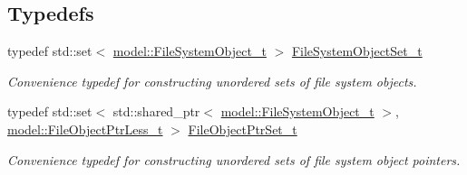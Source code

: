 \subsection*{Typedefs}
\begin{DoxyCompactItemize}
\item 
typedef std\+::set$<$ \hyperlink{structmodel_1_1_file_system_object__t}{model\+::\+File\+System\+Object\+\_\+t} $>$ \hyperlink{namespacemodel_aeb77dad74c69ec8bfc42dc205bac3f4b}{File\+System\+Object\+Set\+\_\+t}
\begin{DoxyCompactList}\small\item\em Convenience typedef for constructing unordered sets of file system objects. \end{DoxyCompactList}\item 
typedef std\+::set$<$ std\+::shared\+\_\+ptr$<$ \hyperlink{structmodel_1_1_file_system_object__t}{model\+::\+File\+System\+Object\+\_\+t} $>$, \hyperlink{structmodel_1_1_file_object_ptr_less__t}{model\+::\+File\+Object\+Ptr\+Less\+\_\+t} $>$ \hyperlink{namespacemodel_aa2a6601c8a948122114a53c1aa584a23}{File\+Object\+Ptr\+Set\+\_\+t}
\begin{DoxyCompactList}\small\item\em Convenience typedef for constructing unordered sets of file system object pointers. \end{DoxyCompactList}\end{DoxyCompactItemize}
